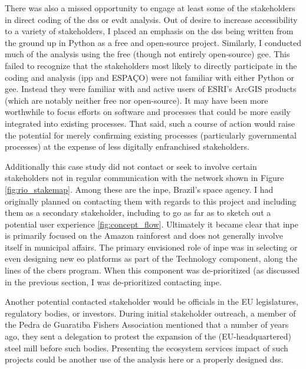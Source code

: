There was also a missed opportunity to engage at least some of the stakeholders in direct coding of the \ac{dss} or \ac{evdt} analysis. Out of desire to increase accessibility to a variety of stakeholders, I placed an emphasis on the \ac{dss} being written from the ground up in Python as a free and open-source project. Similarly, I conducted much of the analysis using the free (though not entirely open-source) \ac{gee}. This failed to recognize that the stakeholders most likely to directly participate in the coding and analysis (\ac{ipp} and ESPAÇO) were not familiar with either Python or \ac{gee}. Instead they were familiar with and active users of ESRI's ArcGIS products (which are notably neither free nor open-source). It may have been more worthwhile to focus efforts on software and processes that could be more easily integrated into existing processes. That said, such a course of action would raise the potential for merely confirming existing processes (particularly governmental processes) at the expense of less digitally enfranchised stakeholders. 

Additionally this case study did not contact or seek to involve certain stakeholders not in regular communication with the network shown in Figure \ref{fig:rio_stakemap}. Among these are the \ac{inpe}, Brazil's space agency. I had originally planned on contacting them with regards to this project and including them as a secondary stakeholder, including to go as far as to sketch out a potential user experience \ref{fig:concept_flow}. Ultimately it became clear that \ac{inpe} is primarily focused on the Amazon rainforest and does not generally involve itself in municipal affairs. The primary envisioned role of \ac{inpe} was in selecting or even designing new \ac{eo} platforms as part of the Technology component, along the lines of the \ac{cbers} program. When this component was de-prioritized (as discussed in the previous section, I was de-prioritized contacting \ac{inpe}. 

Another potential contacted stakeholder would be officials in the EU legislatures, regulatory bodies, or investors. During initial stakeholder outreach, a member of the Pedra de Guaratiba Fishers Association mentioned that a number of years ago, they sent a delegation to protest the expansion of the (EU-headquartered) steel mill before such bodies. Presenting the ecosystem services impact of such projects could be another use of the analysis here or a properly designed \ac{dss}. 

\subsubsection{}

